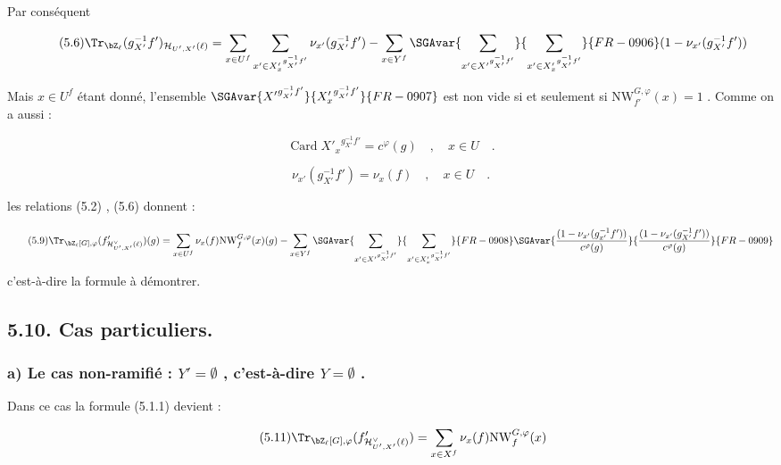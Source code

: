 Par conséquent

\begin{equation}\tag{5.6}
\Tr_{\bZ_\ell}(g_{X'}^{-1}f')_{\mathcal{H}_{U',X'}(\ell)} = \sum_{x \in U^f} \sum_{x' \in {X'_x}^{g_{X'}^{-1}f'}} \nu_{x'}(g_{X'}^{-1}f') - \sum_{x \in Y^f} \SGAvar{\sum_{x' \in {X'}^{g_{X'}^{-1}f'}}}{\sum_{x' \in {X'_x}^{g_{X'}^{-1}f'}}}{FR-0906} (1 - \nu_{x'}(g_{X'}^{-1}f'))
\end{equation}

Mais $x \in U^f$ étant donné, l'ensemble $\SGAvar{{X'}^{g_{X'}^{-1}f'}}{{X'_x}^{g_{X'}^{-1}f'}}{FR-0907}$ est non vide si et seulement si $\mathrm{NW}_{f'}^{G,\varphi}(x) = 1$ . Comme on a aussi :

\begin{equation}\tag{5.7}
\operatorname{Card} {X'_x}^{g_{X'}^{-1}f'} = c^\varphi(g) \quad , \quad x \in U \quad .
\end{equation}

\begin{equation}\tag{5.8}
\nu_{x'}(g_{X'}^{-1}f') = \nu_x(f) \quad , \quad x \in U \quad .
\end{equation}

les relations (5.2) , (5.6) donnent :

\begin{equation}\tag{5.9}
\Tr_{\bZ_\ell[G],\varphi}(f'_{\mathcal{H}^\vee_{U',X'}(\ell)})(g) = \sum_{x \in U^f} \nu_x(f) \mathrm{NW}_f^{G,\varphi}(x)(g) - \sum_{x \in Y^f} \SGAvar{\sum_{x' \in {X'}^{g_{X'}^{-1}f'}}}{\sum_{x' \in {X'_x}^{g_{X'}^{-1}f'}}}{FR-0908} \SGAvar{\frac{(1 - \nu_{x'}(g_{x'}^{-1}f'))}{c^\varphi(g)}}{\frac{(1 - \nu_{x'}(g_{X'}^{-1}f'))}{c^\varphi(g)}}{FR-0909}
\end{equation}
c'est-à-dire la formule à démontrer.

\subsection*{5.10. Cas particuliers.}
\subsubsection*{a) Le cas non-ramifié : $Y' = \emptyset$ , c'est-à-dire $Y = \emptyset$ .}

Dans ce cas la formule (5.1.1) devient :

\begin{equation}\tag{5.11}
\Tr_{\bZ_\ell[G],\varphi}(f'_{\mathcal{H}^\vee_{U',X'}(\ell)}) = \sum_{x \in X^f} \nu_x(f) \mathrm{NW}_f^{G,\varphi}(x)
\end{equation}

